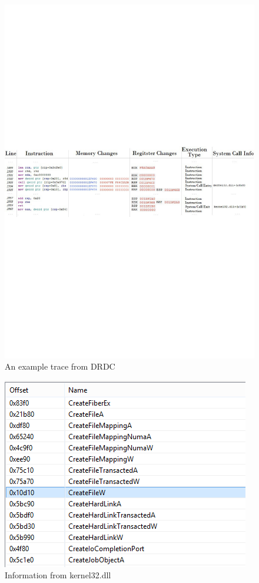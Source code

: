 \documentclass[12pt,oneside]{book}
\providecommand{\DIFaddbeginFL}{} %
\providecommand{\DIFaddendFL}{} %
\providecommand{\DIFdelbeginFL}{} %
\providecommand{\DIFdelendFL}{} %
\newcommand{\DIFscaledelfig}{0.5}
\newlength{\DIFdelgraphicswidth} %
\newlength{\DIFdelgraphicsheight} %
\newcommand{\DIFaddincludegraphics}[2][]{{\color{blue}\fbox{\DIFOincludegraphics[#1]{#2}}}} %
\newcommand{\DIFdelincludegraphics}[2][]{%
\sbox{\DIFdelgraphicsbox}{\DIFOincludegraphics[#1]{#2}}%
\settoboxwidth{\DIFdelgraphicswidth}{\DIFdelgraphicsbox} %
\settoboxtotalheight{\DIFdelgraphicsheight}{\DIFdelgraphicsbox} %
\scalebox{\DIFscaledelfig}{%
\parbox[b]{\DIFdelgraphicswidth}{\usebox{\DIFdelgraphicsbox}\\[-\baselineskip] \rule{\DIFdelgraphicswidth}{0em}}\llap{\resizebox{\DIFdelgraphicswidth}{\DIFdelgraphicsheight}{%
\setlength{\unitlength}{\DIFdelgraphicswidth}%
\begin{picture}(1,1)%
\thicklines\linethickness{2pt} %
{\color[rgb]{1,0,0}\put(0,0){\framebox(1,1){}}}%
{\color[rgb]{1,0,0}\put(0,0){\line( 1,1){1}}}%
{\color[rgb]{1,0,0}\put(0,1){\line(1,-1){1}}}%
\end{picture}%
}\hspace*{3pt}}} %
} %
\DeclareRobustCommand{\DIFaddbeginFL}{\DIFOaddbeginFL \let\includegraphics\DIFaddincludegraphics} %
\DeclareRobustCommand{\DIFaddendFL}{\DIFOaddendFL \let\includegraphics\DIFOincludegraphics} %
\DeclareRobustCommand{\DIFdelbeginFL}{\DIFOdelbeginFL \let\includegraphics\DIFdelincludegraphics} %
\DeclareRobustCommand{\DIFdelendFL}{\DIFOaddendFL \let\includegraphics\DIFOincludegraphics} %
\begin{document}
\begin{figure}[H]
\DIFdelbeginFL %
\DIFdelendFL \DIFaddbeginFL \centerline{\includegraphics[scale=0.55]{Figures/trace}}
\DIFaddendFL \caption{An example trace from DRDC}
\label{trace}
\end{figure}

\begin{figure}[H]
\DIFdelbeginFL %
\DIFdelendFL \DIFaddbeginFL \centerline{\includegraphics{Figures/executable}}
\DIFaddendFL \caption{Information from kernel32.dll}
\label{executable}
\end{figure}
\end{document}
